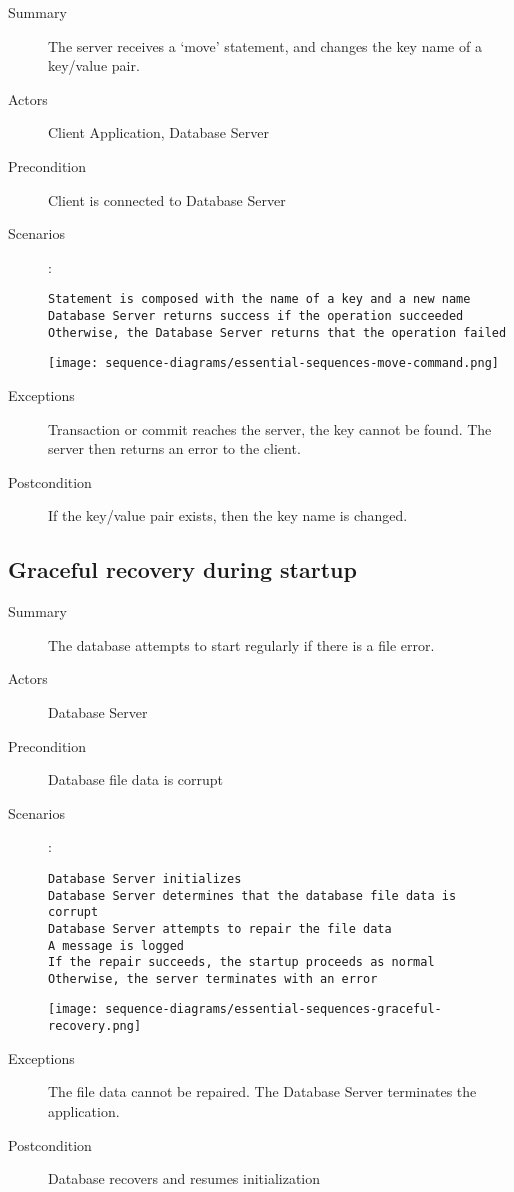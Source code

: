 \documentclass[a4paper]{report}
\begin{document}
	\begin{description}
		\item[Summary] The server receives a ‘move’ statement, and changes the key name of a key/value pair.
		\item[Actors] Client Application, Database Server
		\item[Precondition] Client is connected to Database Server 
		\item[Scenarios] :

		\begin{lstlisting}
Statement is composed with the name of a key and a new name
Database Server returns success if the operation succeeded
Otherwise, the Database Server returns that the operation failed
		\end{lstlisting}

		\begin{center}
			\texttt{[image: sequence-diagrams/essential-sequences-move-command.png]}
		\end{center}

		\item[Exceptions] Transaction or commit reaches the server, the key cannot be found.  The server then returns an error to the client.
		\item[Postcondition] If the key/value pair exists, then the key name is changed.
	\end{description}

	\pagebreak

	\subsection{Graceful recovery during startup}

	\begin{description}
		\item[Summary] The database attempts to start regularly if there is a file error.
		\item[Actors] Database Server
		\item[Precondition] Database file data is corrupt
		\item[Scenarios] :

		\begin{lstlisting}
Database Server initializes
Database Server determines that the database file data is corrupt
Database Server attempts to repair the file data
A message is logged
If the repair succeeds, the startup proceeds as normal
Otherwise, the server terminates with an error
		\end{lstlisting}

		\begin{center}
			\texttt{[image: sequence-diagrams/essential-sequences-graceful-recovery.png]}
		\end{center}

		\item[Exceptions] The file data cannot be repaired.  The Database Server terminates the application.
		\item[Postcondition] Database recovers and resumes initialization
	\end{description}
	
\end{document}
